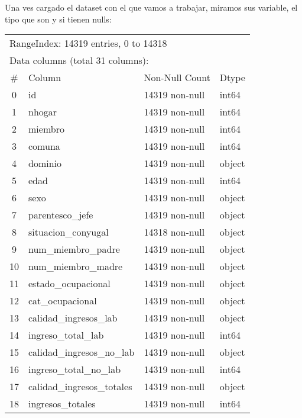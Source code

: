 \documentclass[a4paper]{article}
\begin{document}
    Una ves cargado el dataset con el que vamos a trabajar, miramos sus variable, el tipo que son y si tienen nulls:
    \begin{table}[H]\begin{center}
    \begin{tabular}{clll}
    \multicolumn{4}{l}{RangeIndex: 14319 entries, 0 to 14318} \\
    \multicolumn{4}{l}{Data columns (total 31 columns):}  \\
    \#  & Column                     & Non-Null Count & Dtype \\ \hline
    0  & id                          & 14319 non-null & int64 \\
    1  & nhogar                      & 14319 non-null & int64 \\
    2  & miembro                     & 14319 non-null & int64 \\
    3  & comuna                      & 14319 non-null & int64 \\
    4  & dominio                     & 14319 non-null & object \\
    5  & edad                        & 14319 non-null & int64 \\
    6  & sexo                        & 14319 non-null & object \\
    7  & parentesco\_jefe             & 14319 non-null & object \\
    8  & situacion\_conyugal          & 14318 non-null & object \\
    9  & num\_miembro\_padre           & 14319 non-null & object \\
    10 & num\_miembro\_madre           & 14319 non-null & object \\
    11 & estado\_ocupacional          & 14319 non-null & object \\
    12 & cat\_ocupacional             & 14319 non-null & object \\
    13 & calidad\_ingresos\_lab        & 14319 non-null & object \\
    14 & ingreso\_total\_lab           & 14319 non-null & int64  \\
    15 & calidad\_ingresos\_no\_lab     & 14319 non-null & object \\
    16 & ingreso\_total\_no\_lab        & 14319 non-null & int64  \\
    17 & calidad\_ingresos\_totales    & 14319 non-null & object \\
    18 & ingresos\_totales            & 14319 non-null & int64  \\

\end{tabular}
\end{center}
\end{table}
\end{document}
